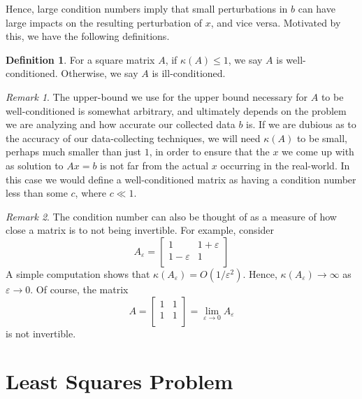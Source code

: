 \documentclass[12pt]{article}
\newcommand{\ee}{\varepsilon}
\theoremstyle{plain}
\theoremstyle{definition}
\newtheorem*{definition}{Definition}
\theoremstyle{remark}
\newtheorem*{remark}{Remark}
\numberwithin{equation}{section}  %
\begin{document}
	Hence, large condition numbers imply that small perturbations in $b$ can have
	large impacts on the resulting perturbation of $x$, and vice versa.
	Motivated by this, we have the following definitions.
	\begin{definition}
		For a square matrix $A$, if $\kappa(A) \le 1$, we say $A$ is well-conditioned.
		Otherwise, we say $A$ is ill-conditioned.
	\end{definition}
	\begin{remark}
		The upper-bound we use for the upper bound necessary for $A$ to be well-conditioned
		is somewhat arbitrary, and ultimately depends on the problem we are analyzing
		and how accurate our collected data $b$ is. If we are dubious as to 
		the accuracy of our data-collecting techniques, we will 
		need $\kappa(A)$ to be small,
		perhaps much smaller than just $1$, in order to
		ensure that the $x$ we come up with as solution to $Ax = b$ is not far
		from the actual $x$ occurring in the real-world. In this case we would define
		a well-conditioned matrix as having a condition number less than some $c$, where
		$c \ll 1$. 
	\end{remark}
	\begin{remark}
		The condition number can also be thought of as a measure of how close a matrix
		is to not being invertible. For example, consider
		\begin{equation*}
			A_\ee = 
			\begin{bmatrix}
				1 & 1+ \ee \\
				1 - \ee & 1 \\
			\end{bmatrix}
		\end{equation*}
		A simple computation shows that $\kappa(A_\ee) = O(1/\ee^2)$.
		Hence, $\kappa(A_\ee) \to \infty$ as $\ee \to 0$. Of course,
		the matrix
		\begin{equation*}
			A = 
			\begin{bmatrix}
				1 & 1 \\
				1  & 1 \\
			\end{bmatrix}
			= \lim_{\ee \to 0} A_\ee
		\end{equation*}
		is not invertible.
	\end{remark}
	\section{Least Squares Problem}
\end{document}
